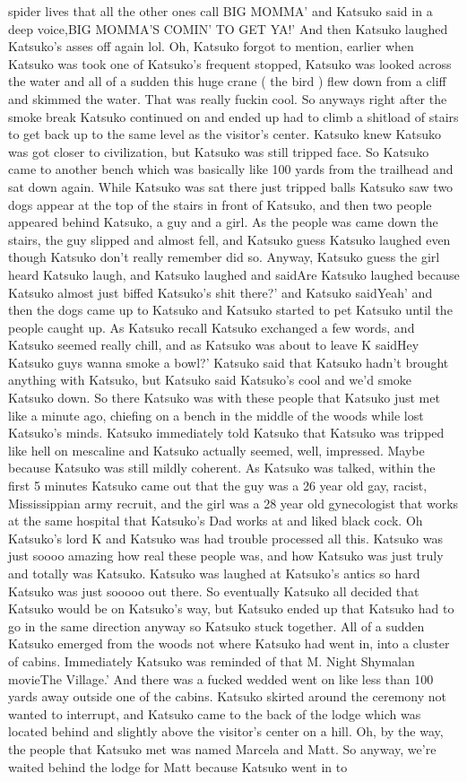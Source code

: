 \documentclass[12pt]{book}
\begin{document}
spider lives that all the other ones call BIG MOMMA' and Katsuko said in a deep voice,BIG MOMMA'S COMIN' TO GET YA!' And then Katsuko laughed Katsuko's asses off again lol. Oh, Katsuko forgot to mention, earlier when Katsuko was took one of Katsuko's frequent stopped, Katsuko was looked across the water and all of a sudden this huge crane ( the bird ) flew down from a cliff and skimmed the water. That was really fuckin cool. So anyways right after the smoke break Katsuko continued on and ended up had to climb a shitload of stairs to get back up to the same level as the visitor's center. Katsuko knew Katsuko was got closer to civilization, but Katsuko was still tripped face. So Katsuko came to another bench which was basically like 100 yards from the trailhead and sat down again. While Katsuko was sat there just tripped balls Katsuko saw two dogs appear at the top of the stairs in front of Katsuko, and then two people appeared behind Katsuko, a guy and a girl. As the people was came down the stairs, the guy slipped and almost fell, and Katsuko guess Katsuko laughed even though Katsuko don't really remember did so. Anyway, Katsuko guess the girl heard Katsuko laugh, and Katsuko laughed and saidAre Katsuko laughed because Katsuko almost just biffed Katsuko's shit there?' and Katsuko saidYeah' and then the dogs came up to Katsuko and Katsuko started to pet Katsuko until the people caught up. As Katsuko recall Katsuko exchanged a few words, and Katsuko seemed really chill, and as Katsuko was about to leave K saidHey Katsuko guys wanna smoke a bowl?' Katsuko said that Katsuko hadn't brought anything with Katsuko, but Katsuko said Katsuko's cool and we'd smoke Katsuko down. So there Katsuko was with these people that Katsuko just met like a minute ago, chiefing on a bench in the middle of the woods while lost Katsuko's minds. Katsuko immediately told Katsuko that Katsuko was tripped like hell on mescaline and Katsuko actually seemed, well, impressed. Maybe because Katsuko was still mildly coherent. As Katsuko was talked, within the first 5 minutes Katsuko came out that the guy was a 26 year old gay, racist, Mississippian army recruit, and the girl was a 28 year old gynecologist that works at the same hospital that Katsuko's Dad works at and liked black cock. Oh Katsuko's lord K and Katsuko was had trouble processed all this. Katsuko was just soooo amazing how real these people was, and how Katsuko was just truly and totally was Katsuko. Katsuko was laughed at Katsuko's antics so hard Katsuko was just sooooo out there. So eventually Katsuko all decided that Katsuko would be on Katsuko's way, but Katsuko ended up that Katsuko had to go in the same direction anyway so Katsuko stuck together. All of a sudden Katsuko emerged from the woods not where Katsuko had went in, into a cluster of cabins. Immediately Katsuko was reminded of that M. Night Shymalan movieThe Village.' And there was a fucked wedded went on like less than 100 yards away outside one of the cabins. Katsuko skirted around the ceremony not wanted to interrupt, and Katsuko came to the back of the lodge which was located behind and slightly above the visitor's center on a hill. Oh, by the way, the people that Katsuko met was named Marcela and Matt. So anyway, we're waited behind the lodge for Matt because Katsuko went in to 
\end{document}
